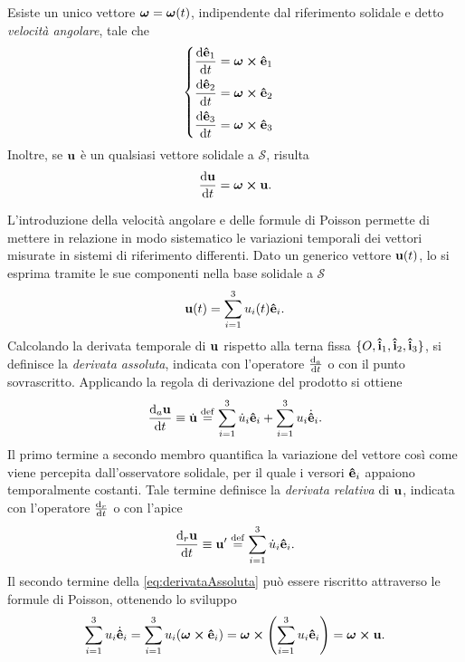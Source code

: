 \begin{theorem}
    Esiste un unico vettore $\vb*{\omega}=\vb*{\omega}(t)$, indipendente dal riferimento solidale e detto \emph{velocità angolare}, tale che
    \begin{equation*}
        \begin{cases}
            \displaystyle \dv{\vu{e}_1}{t} = \vb*{\omega} \cross \vu{e}_1 \\[0.7em]
            \displaystyle \dv{\vu{e}_2}{t} = \vb*{\omega} \cross \vu{e}_2 \\[0.7em]
            \displaystyle \dv{\vu{e}_3}{t} = \vb*{\omega} \cross \vu{e}_3
        \end{cases}
    \end{equation*}
    Inoltre, se $\vb{u}$ è un qualsiasi vettore solidale a $\mathcal{S}$, risulta
    \begin{equation*}
        \dv{\vb{u}}{t} = \vb*{\omega} \cross \vb{u}.
    \end{equation*}
\end{theorem}

L'introduzione della velocità angolare e delle formule di Poisson permette di mettere in relazione in modo sistematico le variazioni temporali dei vettori misurate in sistemi di riferimento differenti. Dato un generico vettore $\vb{u}(t)$, lo si esprima tramite le sue componenti nella base solidale a $\mathcal{S}$
\begin{equation*}
    \vb{u}(t) = \sum_{i=1}^3 u_i(t) \vu{e}_i.
\end{equation*}
Calcolando la derivata temporale di $\vb{u}$ rispetto alla terna fissa $\{O, \vu{i}_1, \vu{i}_2, \vu{i}_3\}$, si definisce la \emph{derivata assoluta}, indicata con l'operatore $\dva{t}$ o con il punto sovrascritto. Applicando la regola di derivazione del prodotto si ottiene
\begin{equation}
    \label{eq:derivataAssoluta}
    \dva{\vvu}{t} \equiv \dot{\vvu} \defeq \sum_{i=1}^3 \dot{u}_i \vu{e}_i + \sum_{i=1}^3 u_i \vud{e}_i.
\end{equation}
Il primo termine a secondo membro quantifica la variazione del vettore così come viene percepita dall'osservatore solidale, per il quale i versori $\vu{e}_i$ appaiono temporalmente costanti. Tale termine definisce la \emph{derivata relativa} di $\vb{u}$, indicata con l'operatore $\dvr{t}$ o con l'apice
\begin{equation*}
    \dvr{\vvu}{t} \equiv \vvu' \defeq \sum_{i=1}^3 \dot{u}_i \vu{e}_i.
\end{equation*}
Il secondo termine della \eqref{eq:derivataAssoluta} può essere riscritto attraverso le formule di Poisson, ottenendo lo sviluppo
\begin{equation*}
    \sum_{i=1}^3 u_i \dot{\bm{\hat{\mathrm{e}}}}_i = \sum_{i=1}^3 u_i (\vb*{\omega} \cross \vu{e}_i) = \vb*{\omega} \cross \left( \sum_{i=1}^3 u_i \vu{e}_i \right) = \vb*{\omega} \cross \vb{u}.
\end{equation*}

